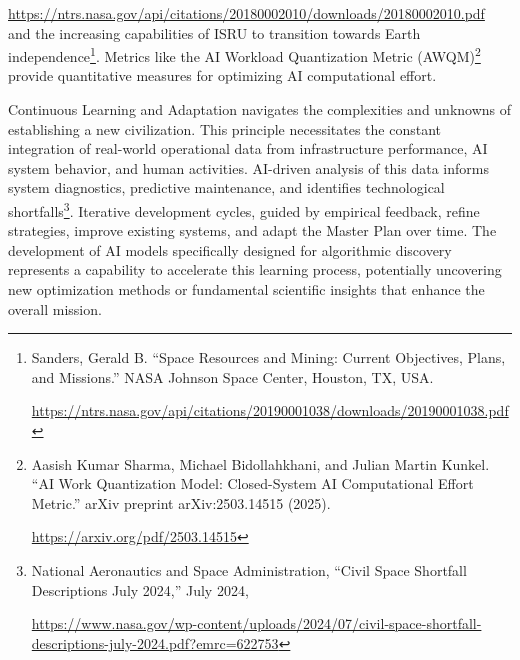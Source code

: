 \documentclass[fontsize=10pt, oneside, DIV=calc]{scrartcl}
\begin{document}
{\href{https://ntrs.nasa.gov/api/citations/20180002010/downloads/20180002010.pdf}\url{https://ntrs.nasa.gov/api/citations/20180002010/downloads/20180002010.pdf}} and the increasing capabilities of ISRU to transition towards Earth independence\footnote{Sanders, Gerald B. ``Space Resources and Mining: Current Objectives, Plans, and Missions.'' NASA Johnson Space Center, Houston, TX, USA. 











\href{https://ntrs.nasa.gov/api/citations/20190001038/downloads/20190001038.pdf}\url{https://ntrs.nasa.gov/api/citations/20190001038/downloads/20190001038.pdf}}. Metrics like the AI Workload Quantization Metric (AWQM)\footnote{Aasish Kumar Sharma, Michael Bidollahkhani, and Julian Martin Kunkel. ``AI Work Quantization Model: Closed-System AI Computational Effort Metric.'' arXiv preprint arXiv:2503.14515 (2025). 











\href{https://arxiv.org/pdf/2503.14515}\url{https://arxiv.org/pdf/2503.14515}} provide quantitative measures for optimizing AI computational effort.

\medskip

\noindent
Continuous Learning and Adaptation navigates the complexities and unknowns of establishing a new civilization. This principle necessitates the constant integration of real-world operational data from infrastructure performance, AI system behavior, and human activities. AI-driven analysis of this data informs system diagnostics, predictive maintenance, and identifies technological shortfalls\footnote{National Aeronautics and Space Administration, ``Civil Space Shortfall Descriptions July 2024,'' July 2024, 











\href{https://www.nasa.gov/wp-content/uploads/2024/07/civil-space-shortfall-descriptions-july-2024.pdf?emrc=622753}\url{https://www.nasa.gov/wp-content/uploads/2024/07/civil-space-shortfall-descriptions-july-2024.pdf?emrc=622753}}. Iterative development cycles, guided by empirical feedback, refine strategies, improve existing systems, and adapt the Master Plan over time. The development of AI models specifically designed for algorithmic discovery represents a capability to accelerate this learning process, potentially uncovering new optimization methods or fundamental scientific insights that enhance the overall mission.
\end{document}
